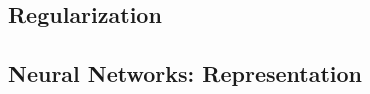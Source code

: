 \documentclass[english, 11pt]{article}
\begin{document}
	\subsection{Regularization}
	

	\subsection{Neural Networks: Representation}
	

\end{document}
